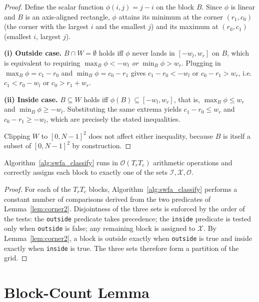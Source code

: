 \begin{proof}
Define the scalar function $\phi(i, j) = j - i$ on the block
$B$. Since $\phi$ is linear and $B$ is an axis-aligned
rectangle, $\phi$ attains its minimum at the corner $(r_1, c_0)$
(the corner with the largest $i$ and the smallest $j$) and its
maximum at $(r_0, c_1)$ (smallest $i$, largest $j$).

\textbf{(i) Outside case.} $B \cap W = \emptyset$ holds iff
$\phi$ never lands in $[-w_l, w_r]$ on $B$, which is equivalent
to requiring $\max_B \phi < -w_l$ \emph{or} $\min_B \phi > w_r$.
Plugging in $\max_B \phi = c_1 - r_0$ and
$\min_B \phi = c_0 - r_1$ gives
$c_1 - r_0 < -w_l$ or $c_0 - r_1 > w_r$, i.e.\
$c_1 < r_0 - w_l$ or $c_0 > r_1 + w_r$.

\textbf{(ii) Inside case.} $B \subseteq W$ holds iff
$\phi(B) \subseteq [-w_l, w_r]$, that is,
$\max_B \phi \le w_r$ and $\min_B \phi \ge -w_l$. Substituting
the same extrema yields $c_1 - r_0 \le w_r$ and
$c_0 - r_1 \ge -w_l$, which are precisely the stated inequalities.

Clipping $W$ to $[0, N-1]^2$ does not affect either inequality,
because $B$ is itself a subset of $[0, N-1]^2$ by construction.
\end{proof}

\begin{corollary}\label{cor:classifier_cost}
Algorithm~\ref{alg:swfa_classify} runs in $\mathcal{O}(T_r T_c)$
arithmetic operations and correctly assigns each block to exactly one
of the sets $\mathcal{I}, \mathcal{X}, \mathcal{O}$.
\end{corollary}

\begin{proof}
For each of the $T_r T_c$ blocks,
Algorithm~\ref{alg:swfa_classify} performs a constant number of
comparisons derived from the two predicates of
Lemma~\ref{lem:corner2}. Disjointness of the three sets is
enforced by the order of the tests: the \texttt{outside}
predicate takes precedence; the \texttt{inside} predicate is
tested only when \texttt{outside} is false; any remaining block
is assigned to $\mathcal{X}$. By Lemma~\ref{lem:corner2}, a
block is outside exactly when \texttt{outside} is true and
inside exactly when \texttt{inside} is true. The three sets
therefore form a partition of the grid.
\end{proof}

\section{Block-Count Lemma}\label{app:proofs_block}

